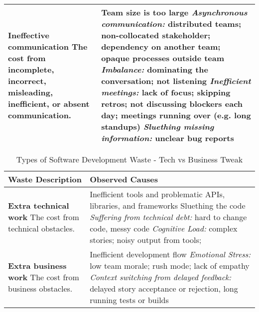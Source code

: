 \begin{table*}[htbp]
\begin{tabular}{|p{2.5in}|p{3.6in}|}
\textbf{Ineffective communication} \newline The cost from incomplete, incorrect, misleading, inefficient, or absent communication.                         & Team size is too large \newline \textit{Asynchronous communication:} distributed teams; non-collocated stakeholder; dependency on another team; opaque processes outside team \newline \textit{Imbalance:} dominating the conversation; not listening \newline \textit{Inefficient meetings:} lack of focus; skipping retros; not discussing blockers each day; meetings running over (e.g. long standups) \newline
\textbf{\textit{Sluething missing information:} unclear bug reports}
\\ \hline                  
\end{tabular} 
\end{table*}

















\begin{table*}[htbp]
\renewcommand{\arraystretch}{1.3}
\centering
\caption{Types of Software Development Waste - Tech vs Business Tweak}
\label{Waste}
\begin{tabular}{|p{2.5in}|p{3.6in}|} %
\hline
\textbf{Waste} \newline Description  & Observed Causes 
\\ \hline
\textbf{Extra technical work} \newline   
The cost from technical obstacles.  & 
Inefficient tools and problematic APIs, libraries, and frameworks  \newline
Sluething the code \newline
\textit{Suffering from technical debt:} hard to change code, messy code \newline
\textit{Cognitive Load:} complex stories; noisy output from tools; \newline
\\ \hline
\textbf{Extra business work} \newline 
The cost from business obstacles. & 
Inefficient development flow \newline
\textit{Emotional Stress:} low team morale; rush mode; lack of empathy \newline 
\textit{Context switching from delayed feedback:} delayed story acceptance or rejection, long running tests or builds     \\ \hline
\end{tabular} 
\end{table*}

